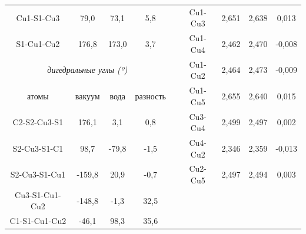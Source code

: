 \documentclass[a4paper,12pt]{article}
\begin{document}
\begin{onehalfspace}
\begin{table}[H]
\begin{tabular}{|cccc|ccccc}
			\multicolumn{1}{|c|}{Cu1-S1-Cu3}     & \multicolumn{1}{c|}{79,0}   & \multicolumn{1}{c|}{73,1}  & 5,8      & \multicolumn{1}{c|}{} & \multicolumn{1}{c|}{Cu1-Cu3} & \multicolumn{1}{c|}{2,651}    & \multicolumn{1}{c|}{2,638}    & \multicolumn{1}{c|}{0,013}    \\ \cline{1-4} \cline{6-9} 
			\multicolumn{1}{|c|}{S1-Cu1-Cu2}     & \multicolumn{1}{c|}{176,8}  & \multicolumn{1}{c|}{173,0} & 3,7      & \multicolumn{1}{c|}{} & \multicolumn{1}{c|}{Cu1-Cu4} & \multicolumn{1}{c|}{2,462}    & \multicolumn{1}{c|}{2,470}    & \multicolumn{1}{c|}{-0,008}   \\ \cline{1-4} \cline{6-9} 
			\multicolumn{4}{|c|}{\textit{дигедральные углы   (º)}}                                                     & \multicolumn{1}{c|}{} & \multicolumn{1}{c|}{Cu1-Cu2} & \multicolumn{1}{c|}{2,464}    & \multicolumn{1}{c|}{2,473}    & \multicolumn{1}{c|}{-0,009}   \\ \cline{1-4} \cline{6-9} 
			\multicolumn{1}{|c|}{атомы}          & \multicolumn{1}{c|}{вакуум} & \multicolumn{1}{c|}{вода}  & разность & \multicolumn{1}{c|}{} & \multicolumn{1}{c|}{Cu1-Cu5} & \multicolumn{1}{c|}{2,655}    & \multicolumn{1}{c|}{2,640}    & \multicolumn{1}{c|}{0,015}    \\ \cline{1-4} \cline{6-9} 
			\multicolumn{1}{|c|}{C2-S2-Cu3-S1}   & \multicolumn{1}{c|}{176,1}  & \multicolumn{1}{c|}{3,1}   & 0,8      & \multicolumn{1}{c|}{} & \multicolumn{1}{c|}{Cu3-Cu4} & \multicolumn{1}{c|}{2,499}    & \multicolumn{1}{c|}{2,497}    & \multicolumn{1}{c|}{0,002}    \\ \cline{1-4} \cline{6-9} 
			\multicolumn{1}{|c|}{S2-Cu3-S1-C1}   & \multicolumn{1}{c|}{98,7}   & \multicolumn{1}{c|}{-79,8} & -1,5     & \multicolumn{1}{c|}{} & \multicolumn{1}{c|}{Cu4-Cu2} & \multicolumn{1}{c|}{2,346}    & \multicolumn{1}{c|}{2,359}    & \multicolumn{1}{c|}{-0,013}   \\ \cline{1-4} \cline{6-9} 
			\multicolumn{1}{|c|}{S2-Cu3-S1-Cu1}  & \multicolumn{1}{c|}{-159,8} & \multicolumn{1}{c|}{20,9}  & -0,7     & \multicolumn{1}{c|}{} & \multicolumn{1}{c|}{Cu2-Cu5} & \multicolumn{1}{c|}{2,497}    & \multicolumn{1}{c|}{2,494}    & \multicolumn{1}{c|}{0,003}    \\ \cline{1-4} \cline{6-9} 
			\multicolumn{1}{|c|}{Cu3-S1-Cu1-Cu2} & \multicolumn{1}{c|}{-148,8} & \multicolumn{1}{c|}{-1,3}  & 32,5     &                       &                              &                               &                               &                               \\ \cline{1-4}
			\multicolumn{1}{|c|}{C1-S1-Cu1-Cu2}  & \multicolumn{1}{c|}{-46,1}  & \multicolumn{1}{c|}{98,3}  & 35,6     &                       &                              & \multicolumn{1}{l}{\textit{}} & \multicolumn{1}{l}{\textit{}} & \multicolumn{1}{l}{\textit{}} \\ \cline{1-4}
		\end{tabular}
	\end{table}
	

\end{onehalfspace}
\end{document}

